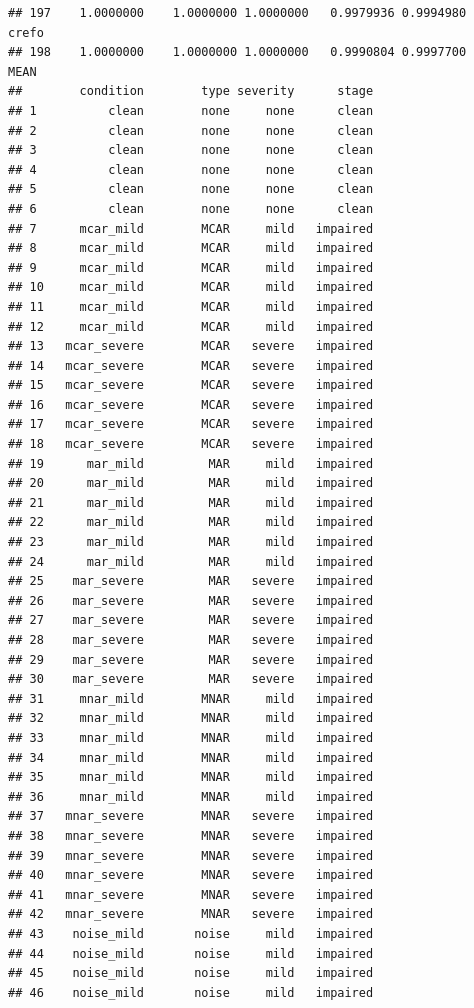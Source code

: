 \documentclass[
]{article}
\begin{document}
\begin{verbatim}
## 197    1.0000000    1.0000000 1.0000000   0.9979936 0.9994980          crefo
## 198    1.0000000    1.0000000 1.0000000   0.9990804 0.9997700           MEAN
##        condition        type severity      stage
## 1          clean        none     none      clean
## 2          clean        none     none      clean
## 3          clean        none     none      clean
## 4          clean        none     none      clean
## 5          clean        none     none      clean
## 6          clean        none     none      clean
## 7      mcar_mild        MCAR     mild   impaired
## 8      mcar_mild        MCAR     mild   impaired
## 9      mcar_mild        MCAR     mild   impaired
## 10     mcar_mild        MCAR     mild   impaired
## 11     mcar_mild        MCAR     mild   impaired
## 12     mcar_mild        MCAR     mild   impaired
## 13   mcar_severe        MCAR   severe   impaired
## 14   mcar_severe        MCAR   severe   impaired
## 15   mcar_severe        MCAR   severe   impaired
## 16   mcar_severe        MCAR   severe   impaired
## 17   mcar_severe        MCAR   severe   impaired
## 18   mcar_severe        MCAR   severe   impaired
## 19      mar_mild         MAR     mild   impaired
## 20      mar_mild         MAR     mild   impaired
## 21      mar_mild         MAR     mild   impaired
## 22      mar_mild         MAR     mild   impaired
## 23      mar_mild         MAR     mild   impaired
## 24      mar_mild         MAR     mild   impaired
## 25    mar_severe         MAR   severe   impaired
## 26    mar_severe         MAR   severe   impaired
## 27    mar_severe         MAR   severe   impaired
## 28    mar_severe         MAR   severe   impaired
## 29    mar_severe         MAR   severe   impaired
## 30    mar_severe         MAR   severe   impaired
## 31     mnar_mild        MNAR     mild   impaired
## 32     mnar_mild        MNAR     mild   impaired
## 33     mnar_mild        MNAR     mild   impaired
## 34     mnar_mild        MNAR     mild   impaired
## 35     mnar_mild        MNAR     mild   impaired
## 36     mnar_mild        MNAR     mild   impaired
## 37   mnar_severe        MNAR   severe   impaired
## 38   mnar_severe        MNAR   severe   impaired
## 39   mnar_severe        MNAR   severe   impaired
## 40   mnar_severe        MNAR   severe   impaired
## 41   mnar_severe        MNAR   severe   impaired
## 42   mnar_severe        MNAR   severe   impaired
## 43    noise_mild       noise     mild   impaired
## 44    noise_mild       noise     mild   impaired
## 45    noise_mild       noise     mild   impaired
## 46    noise_mild       noise     mild   impaired

\end{verbatim}
\end{document}
